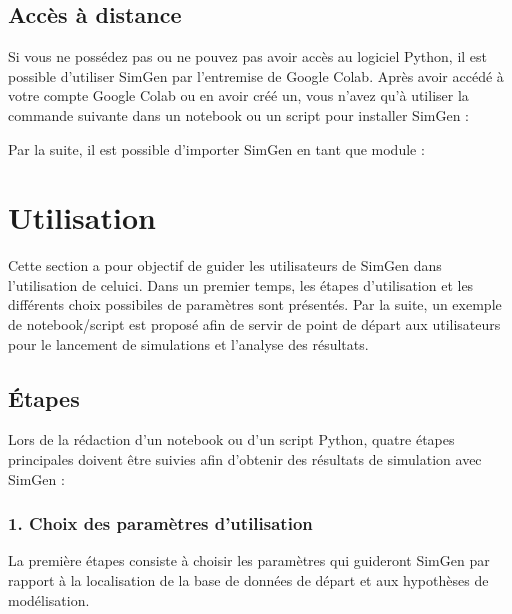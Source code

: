 \documentclass[letterpaper,10pt,french]{sphinxmanual}
\begin{document}
\section{Accès à distance}
\label{\detokenize{installation:acces-a-distance}}
Si vous ne possédez pas ou ne pouvez pas avoir accès au logiciel Python,
il est possible d’utiliser SimGen par l’entremise de Google Colab.
Après avoir accédé à votre compte Google Colab ou en avoir créé un, vous n’avez
qu’à utiliser la commande suivante dans un notebook ou un script pour installer SimGen :

\begin{sphinxVerbatim}[commandchars=\\\{\}]
  
\end{sphinxVerbatim}

Par la suite, il est possible d’importer SimGen en tant que module :

\begin{sphinxVerbatim}[commandchars=\\\{\}]
 
\end{sphinxVerbatim}


\chapter{Utilisation}
\label{\detokenize{utilisation:utilisation}}\label{\detokenize{utilisation:id1}}\label{\detokenize{utilisation::doc}}
Cette section a pour objectif de guider les utilisateurs de SimGen dans l’utilisation de celui\sphinxhyphen{}ci.
Dans un premier temps, les étapes d’utilisation et les différents choix possibiles de paramètres sont présentés.
Par la suite, un exemple de notebook/script est proposé afin de servir de point de départ
aux utilisateurs pour le lancement de simulations et l’analyse des résultats.


\section{Étapes}
\label{\detokenize{utilisation:etapes}}
Lors de la rédaction d’un notebook ou d’un script Python, quatre étapes principales doivent être suivies afin d’obtenir des résultats de simulation avec SimGen :


\subsection{1. Choix des paramètres d’utilisation}
\label{\detokenize{utilisation:choix-des-parametres-d-utilisation}}
La première étapes consiste à choisir les paramètres qui guideront SimGen par rapport à la localisation de la base de données de départ et
aux hypothèses de modélisation.
\end{document}
